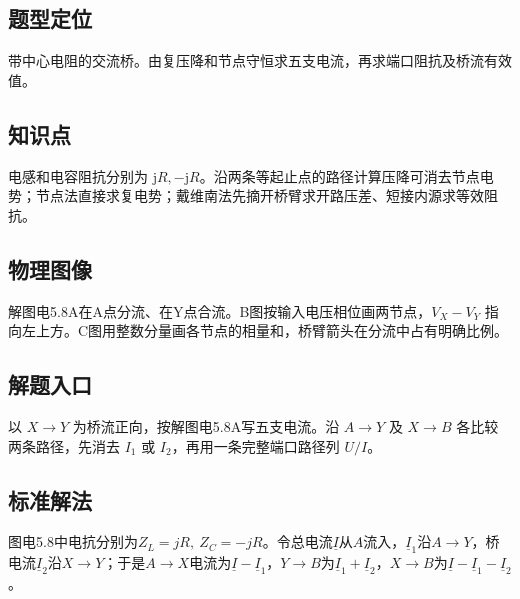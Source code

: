 \documentclass[UTF8,fontset=fandol,a4paper,11pt]{ctexart}
\begin{document}


\subsection*{题型定位}

带中心电阻的交流桥。由复压降和节点守恒求五支电流，再求端口阻抗及桥流有效值。



\subsection*{知识点}

电感和电容阻抗分别为 $\mathrm jR,-\mathrm jR$。沿两条等起止点的路径计算压降可消去节点电势；节点法直接求复电势；戴维南法先摘开桥臂求开路压差、短接内源求等效阻抗。



\subsection*{物理图像}

解图电5.8A在A点分流、在Y点合流。B图按输入电压相位画两节点，$V_X-V_Y$ 指向左上方。C图用整数分量画各节点的相量和，桥臂箭头在分流中占有明确比例。



\subsection*{解题入口}

以 $X\to Y$ 为桥流正向，按解图电5.8A写五支电流。沿 $A\to Y$ 及 $X\to B$ 各比较两条路径，先消去 $I_1$ 或 $I_2$，再用一条完整端口路径列 $U/I$。


\subsection*{标准解法}


图电5.8中电抗分别为$Z_L=jR,\ Z_C=-jR$。令总电流$\underline I$从$A$流入，$\underline I_1$沿$A\to Y$，桥电流$\underline I_2$沿$X\to Y$；于是$A\to X$电流为$\underline I-\underline I_1$，$Y\to B$为$\underline I_1+\underline I_2$，$X\to B$为$\underline I-\underline I_1-\underline I_2$。
\end{document}
